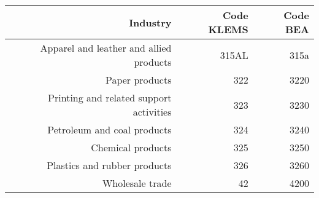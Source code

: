 \begin{landscape}
\begin{table}[h]
    \begin{center}
        \begin{tabular}{rrr}
            Industry                                                             & Code KLEMS & Code BEA   \\%
            \hline\hline
            Apparel and leather and allied products                              & 315AL       & 315a      \\%
            Paper products                                                       & 322         & 3220      \\%
            Printing and related support activities                              & 323         & 3230      \\%
Petroleum and coal products                                          & 324         & 3240      \\%
Chemical products                                                    & 325         & 3250      \\%
Plastics and rubber products                                         & 326         & 3260      \\%
Wholesale trade                                                      & 42          & 4200      \\%

\end{tabular}
\end{center}
\end{table}
\end{landscape}
